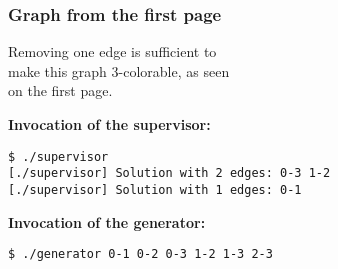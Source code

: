 \vspace{7mm}
\begin{multicols}{2}
\subsubsection*{Graph from the first page}


Removing one edge is sufficient to\\
make this graph 3-colorable, as seen\\
on the first page.

\columnbreak

\textbf{Invocation of the supervisor:}
\vspace{-5mm}
\begin{verbatim}
$ ./supervisor
[./supervisor] Solution with 2 edges: 0-3 1-2
[./supervisor] Solution with 1 edges: 0-1
\end{verbatim}

\textbf{Invocation of the generator:}
\vspace{-5mm}
\begin{verbatim}
$ ./generator 0-1 0-2 0-3 1-2 1-3 2-3
\end{verbatim}
\end{multicols}

